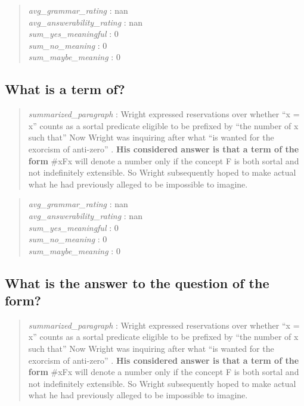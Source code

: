 \begin{quote}
\emph{avg\_grammar\_rating} : nan\\
\emph{avg\_answerability\_rating} : nan\\
\emph{sum\_yes\_meaningful} : 0\\
\emph{sum\_no\_meaning} : 0\\
\emph{sum\_maybe\_meaning} : 0
\end{quote}

\hypertarget{what-is-a-term-of}{%
\subsection{What is a term of?}\label{what-is-a-term-of}}

\begin{quote}
\emph{summarized\_paragraph} : Wright expressed reservations over
whether ``x = x'' counts as a sortal predicate eligible to be prefixed
by ``the number of x such that'' Now Wright was inquiring after what
``is wanted for the exorcism of anti-zero'' . \textbf{His considered
answer is that a term of the form }\#xFx will denote a number only if
the concept F is both sortal and not indefinitely extensible. So Wright
subsequently hoped to make actual what he had previously alleged to be
impossible to imagine.
\end{quote}

\begin{quote}
\emph{avg\_grammar\_rating} : nan\\
\emph{avg\_answerability\_rating} : nan\\
\emph{sum\_yes\_meaningful} : 0\\
\emph{sum\_no\_meaning} : 0\\
\emph{sum\_maybe\_meaning} : 0
\end{quote}

\hypertarget{what-is-the-answer-to-the-question-of-the-form}{%
\subsection{What is the answer to the question of the
form?}\label{what-is-the-answer-to-the-question-of-the-form}}

\begin{quote}
\emph{summarized\_paragraph} : Wright expressed reservations over
whether ``x = x'' counts as a sortal predicate eligible to be prefixed
by ``the number of x such that'' Now Wright was inquiring after what
``is wanted for the exorcism of anti-zero'' . \textbf{His considered
answer is that a term of the form }\#xFx will denote a number only if
the concept F is both sortal and not indefinitely extensible. So Wright
subsequently hoped to make actual what he had previously alleged to be
impossible to imagine.
\end{quote}

